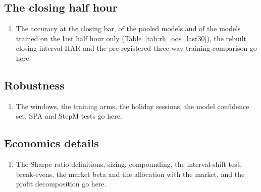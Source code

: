 \subsection{The closing half hour}
\label{app:rh_closing_bench}\label{app:rh_closing}
\begin{enumerate}
\item The accuracy at the closing bar, of the pooled models and of the models trained on the last half hour only
  (Table~\ref{tab:rh_oos_last30}), the rebuilt closing-interval HAR and the pre-registered three-way training
  comparison go here.
\end{enumerate}



\subsection{Robustness}
\label{app:robust}
\begin{enumerate}
\item The windows, the training arms, the holiday sessions, the model confidence set, SPA and StepM tests go here.
\end{enumerate}

\subsection{Economics details}
\label{app:econ}
\begin{enumerate}
\item The Sharpe ratio definitions, sizing, compounding, the interval-shift test, break-evens, the market beta and the
  allocation with the market, and the profit decomposition go here.
\end{enumerate}





